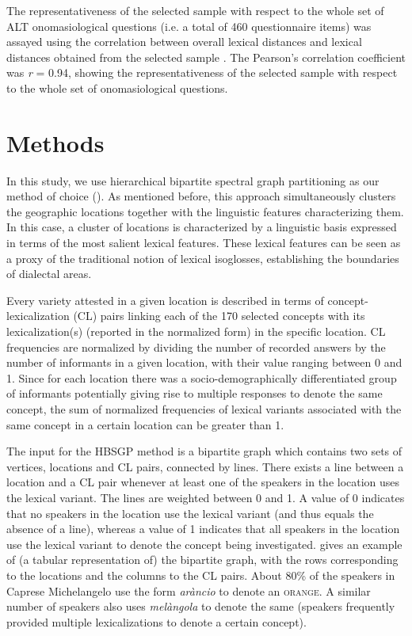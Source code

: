 \documentclass[output=paper]{LSP/langsci}
\begin{document}
The representativeness of the selected sample with respect to the whole set of ALT onomasiological questions (i.e. a total of 460 questionnaire items) was assayed using the correlation between overall lexical distances and lexical distances obtained from the selected sample \citep{wieling_analyzing_2014}. The Pearson’s correlation coefficient was \textit{r} = 0.94, showing the representativeness of the selected sample with respect to the whole set of onomasiological questions.

\section{Methods}
In this study, we use hierarchical bipartite spectral graph partitioning as our method of choice (\cite{wieling_bipartite_2011}). As mentioned before, this approach simultaneously clusters the geographic locations together with the linguistic features characterizing them. In this case, a cluster of locations is characterized by a linguistic basis expressed in terms of the most salient lexical features. These lexical features can be seen as a proxy of the traditional notion of lexical isoglosses, establishing the boundaries of dialectal areas.

Every variety attested in a given location is described in terms of concept-lexicalization (CL) pairs linking each of the 170 selected concepts with its lexicalization(s) (reported in the normalized form) in the specific location. CL frequencies are normalized by dividing the number of recorded answers by the number of informants in a given location, with their value ranging between 0 and 1. Since for each location there was a socio-demographically differentiated group of informants potentially giving rise to multiple responses to denote the same concept, the sum of normalized frequencies of lexical variants associated with the same concept in a certain location can be greater than 1.

The input for the HBSGP method is a bipartite graph which contains two sets of vertices, locations and CL pairs, connected by lines. There exists a line between a location and a CL pair whenever at least one of the speakers in the location uses the lexical variant. The lines are weighted between 0 and 1. A value of 0 indicates that no speakers in the location use the lexical variant (and thus equals the absence of a line), whereas a value of 1 indicates that all speakers in the location use the lexical variant to denote the concept being investigated.  gives an example of (a tabular representation of) the bipartite graph, with the rows corresponding to the locations and the columns to the CL pairs. About 80\% of the speakers in Caprese Michelangelo use the form \textit{aràncio} to denote an \textsc{orange}. A similar number of speakers also uses \textit{melàngola} to denote the same (speakers frequently provided multiple lexicalizations to denote a certain concept). 
\end{document}
